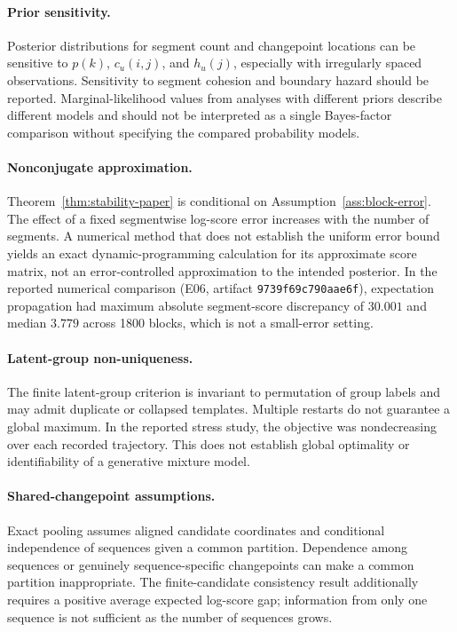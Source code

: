\paragraph{Prior sensitivity.}
Posterior distributions for segment count and changepoint locations can be sensitive to $p(k)$, $c_u(i,j)$, and $h_u(j)$, especially with irregularly spaced observations. Sensitivity to segment cohesion and boundary hazard should be reported. Marginal-likelihood values from analyses with different priors describe different models and should not be interpreted as a single Bayes-factor comparison without specifying the compared probability models.

\paragraph{Nonconjugate approximation.}
Theorem~\ref{thm:stability-paper} is conditional on Assumption~\ref{ass:block-error}. The effect of a fixed segmentwise log-score error increases with the number of segments. A numerical method that does not establish the uniform error bound yields an exact dynamic-programming calculation for its approximate score matrix, not an error-controlled approximation to the intended posterior. In the reported numerical comparison (E06, artifact \texttt{9739f69c790aae6f}), expectation propagation had maximum absolute segment-score discrepancy of $30.001$ and median $3.779$ across 1800 blocks, which is not a small-error setting.

\paragraph{Latent-group non-uniqueness.}
The finite latent-group criterion is invariant to permutation of group labels and may admit duplicate or collapsed templates. Multiple restarts do not guarantee a global maximum. In the reported stress study, the objective was nondecreasing over each
recorded trajectory. This does not establish global optimality or
identifiability of a generative mixture model.

\paragraph{Shared-changepoint assumptions.}
Exact pooling assumes aligned candidate coordinates and conditional independence of sequences given a common partition. Dependence among sequences or genuinely sequence-specific changepoints can make a common partition inappropriate. The finite-candidate consistency result additionally requires a positive average expected log-score gap; information from only one sequence is not sufficient as the number of sequences grows.

